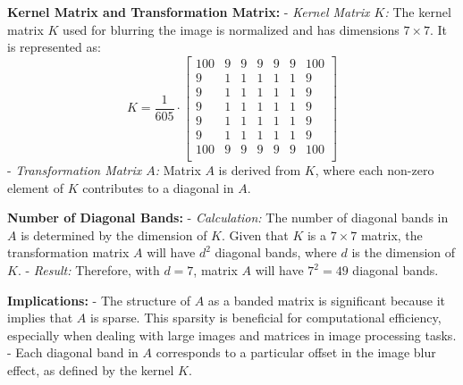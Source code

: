 \documentclass[unicode,11pt,a4paper,oneside,numbers=endperiod,openany]{scrartcl}
\begin{document}
\textbf{Kernel Matrix and Transformation Matrix:}
- \textit{Kernel Matrix \( K \):} The kernel matrix \( K \) used for blurring the image is normalized and has dimensions \( 7 \times 7 \). It is represented as:
  \[
  K = \frac{1}{605} \cdot
  \begin{bmatrix}
  100 & 9 & 9 & 9 & 9 & 9 & 100 \\
  9 & 1 & 1 & 1 & 1 & 1 & 9 \\
  9 & 1 & 1 & 1 & 1 & 1 & 9 \\
  9 & 1 & 1 & 1 & 1 & 1 & 9 \\
  9 & 1 & 1 & 1 & 1 & 1 & 9 \\
  9 & 1 & 1 & 1 & 1 & 1 & 9 \\
  100 & 9 & 9 & 9 & 9 & 9 & 100 \\
  \end{bmatrix}
  \]
- \textit{Transformation Matrix \( A \):} Matrix \( A \) is derived from \( K \), where each non-zero element of \( K \) contributes to a diagonal in \( A \).

\textbf{Number of Diagonal Bands:}
- \textit{Calculation:} The number of diagonal bands in \( A \) is determined by the dimension of \( K \). Given that \( K \) is a \( 7 \times 7 \) matrix, the transformation matrix \( A \) will have \( d^2 \) diagonal bands, where \( d \) is the dimension of \( K \).
- \textit{Result:} Therefore, with \( d = 7 \), matrix \( A \) will have \( 7^2 = 49 \) diagonal bands.

\textbf{Implications:}
- The structure of \( A \) as a banded matrix is significant because it implies that \( A \) is sparse. This sparsity is beneficial for computational efficiency, especially when dealing with large images and matrices in image processing tasks.
- Each diagonal band in \( A \) corresponds to a particular offset in the image blur effect, as defined by the kernel \( K \).
\newline\newline
\end{document}
